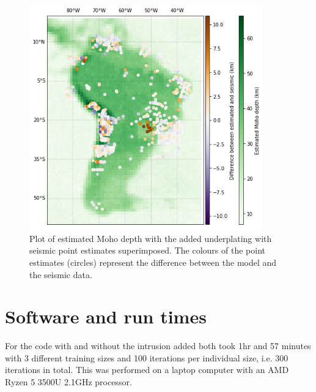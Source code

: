 \begin{figure}[h]
  \begin{center}
    \includegraphics[width=0.9\textwidth]{figures/difference}
  \end{center}
  \caption{
   Plot of estimated Moho depth with the added underplating with seismic point estimates superimposed. The colours of the point estimates (circles) represent the difference between the model and the seismic data.
  }
  \label{fig:difference}
\end{figure}
\section{Software and run times}
For the code with and without the intrusion added both took 1hr and 57 minutes with 3 different training sizes and 100 iterations per individual size, i.e. 300 iterations in total. This was performed on a laptop computer with an AMD Ryzen 5 3500U 2.1GHz processor.